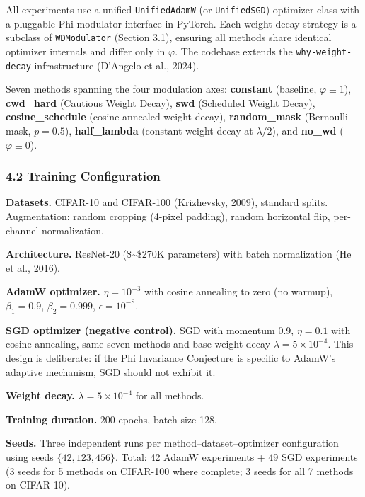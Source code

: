 \documentclass[
]{article}
\begin{document}
All experiments use a unified \texttt{UnifiedAdamW} (or
\texttt{UnifiedSGD}) optimizer class with a pluggable Phi modulator
interface in PyTorch. Each weight decay strategy is a subclass of
\texttt{WDModulator} (Section 3.1), ensuring all methods share identical
optimizer internals and differ only in \(\varphi\). The codebase extends
the \texttt{why-weight-decay} infrastructure (D'Angelo et al., 2024).

Seven methods spanning the four modulation axes: \textbf{constant}
(baseline, \(\varphi \equiv 1\)), \textbf{cwd\_hard} (Cautious Weight
Decay), \textbf{swd} (Scheduled Weight Decay), \textbf{cosine\_schedule}
(cosine-annealed weight decay), \textbf{random\_mask} (Bernoulli mask,
\(p = 0.5\)), \textbf{half\_lambda} (constant weight decay at
\(\lambda/2\)), and \textbf{no\_wd} (\(\varphi \equiv 0\)).

\hypertarget{training-configuration}{%
\subsubsection{4.2 Training
Configuration}\label{training-configuration}}

\textbf{Datasets.} CIFAR-10 and CIFAR-100 (Krizhevsky, 2009), standard
splits. Augmentation: random cropping (4-pixel padding), random
horizontal flip, per-channel normalization.

\textbf{Architecture.} ResNet-20 (\$\sim\$270K parameters) with batch
normalization (He et al., 2016).

\textbf{AdamW optimizer.} \(\eta = 10^{-3}\) with cosine annealing to
zero (no warmup), \(\beta_1 = 0.9\), \(\beta_2 = 0.999\),
\(\epsilon = 10^{-8}\).

\textbf{SGD optimizer (negative control).} SGD with momentum 0.9,
\(\eta = 0.1\) with cosine annealing, same seven methods and base weight
decay \(\lambda = 5 \times 10^{-4}\). This design is deliberate: if the
Phi Invariance Conjecture is specific to AdamW's adaptive mechanism, SGD
should not exhibit it.

\textbf{Weight decay.} \(\lambda = 5 \times 10^{-4}\) for all methods.

\textbf{Training duration.} 200 epochs, batch size 128.

\textbf{Seeds.} Three independent runs per method--dataset--optimizer
configuration using seeds \(\{42, 123, 456\}\). Total: 42 AdamW
experiments + 49 SGD experiments (3 seeds for 5 methods on CIFAR-100
where complete; 3 seeds for all 7 methods on CIFAR-10).
\end{document}
